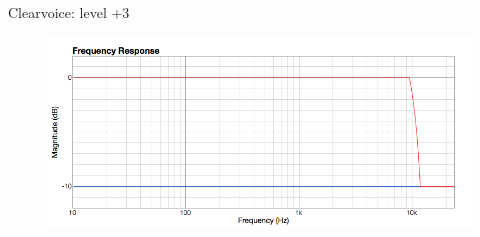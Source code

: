 \documentclass{beamer}
\begin{document}
\begin{frame}[t]{Clearvoice: level +3}
\begin{figure}[b]
\includegraphics[height=0.37\textwidth]{figure/cv3.png}
\end{figure}

\end{frame}


\end{document}
